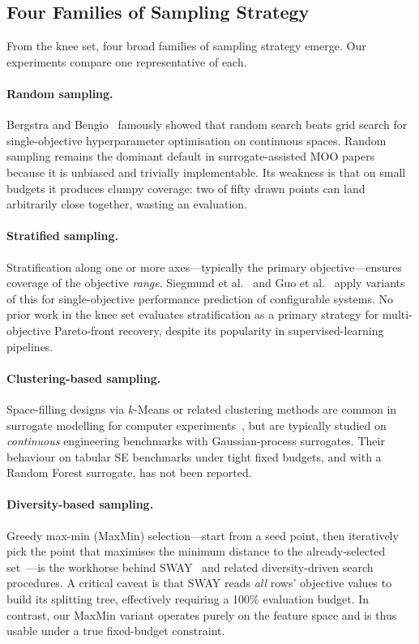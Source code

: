 \documentclass[sigconf,nonacm]{acmart}
\begin{document}
\subsection{Four Families of Sampling Strategy}

From the knee set, four broad families of sampling strategy emerge.
Our experiments compare one representative of each.

\paragraph{Random sampling.}
Bergstra and Bengio~\cite{bergstra2012random} famously showed that random
search beats grid search for single-objective hyperparameter optimisation on
continuous spaces.
Random sampling remains the dominant default in surrogate-assisted MOO
papers~\cite{nair2018finding,wang2020adaptive} because it is unbiased and
trivially implementable.
Its weakness is that on small budgets it produces clumpy coverage: two of
fifty drawn points can land arbitrarily close together, wasting an evaluation.

\paragraph{Stratified sampling.}
Stratification along one or more axes---typically the primary
objective---ensures coverage of the objective \emph{range}.
Siegmund et al.~\cite{siegmund2012predicting} and Guo et
al.~\cite{guo2018data} apply variants of this for single-objective
performance prediction of configurable systems.
No prior work in the knee set evaluates stratification as a primary strategy
for multi-objective Pareto-front recovery, despite its popularity in
supervised-learning pipelines.

\paragraph{Clustering-based sampling.}
Space-filling designs via $k$-Means or related clustering methods are common
in surrogate modelling for computer experiments~\cite{zuluaga2013active}, but
are typically studied on \emph{continuous} engineering benchmarks with
Gaussian-process surrogates.
Their behaviour on tabular SE benchmarks under tight fixed budgets, and with
a Random Forest surrogate, has not been reported.

\paragraph{Diversity-based sampling.}
Greedy max-min (MaxMin) selection---start from a seed point, then
iteratively pick the point that maximises the minimum distance to the
already-selected set~\cite{sayyad2013value}---is the workhorse behind
SWAY~\cite{chen2019sampling} and related diversity-driven search procedures.
A critical caveat is that SWAY reads \emph{all} rows' objective values to
build its splitting tree, effectively requiring a 100\% evaluation budget.
In contrast, our MaxMin variant operates purely on the feature space and is
thus usable under a true fixed-budget constraint.
\end{document}
